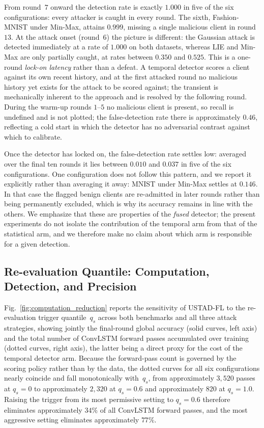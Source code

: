 \documentclass[journal]{IEEEtran}
\begin{document}
From round~$7$ onward the detection rate is exactly $1.000$ in five of the six configurations: every attacker is caught in every round. The sixth, Fashion-MNIST under Min-Max, attains $0.999$, missing a single malicious client in round~$13$. At the attack onset (round~$6$) the picture is different: the Gaussian attack is detected immediately at a rate of $1.000$ on both datasets, whereas LIE and Min-Max are only partially caught, at rates between $0.350$ and $0.525$. This is a one-round \emph{lock-on latency} rather than a defeat. A temporal detector scores a client against its own recent history, and at the first attacked round no malicious history yet exists for the attack to be scored against; the transient is mechanically inherent to the approach and is resolved by the following round. During the warm-up rounds $1$--$5$ no malicious client is present, so recall is undefined and is not plotted; the false-detection rate there is approximately $0.46$, reflecting a cold start in which the detector has no adversarial contrast against which to calibrate.

Once the detector has locked on, the false-detection rate settles low: averaged over the final ten rounds it lies between $0.010$ and $0.037$ in five of the six configurations. One configuration does not follow this pattern, and we report it explicitly rather than averaging it away: MNIST under Min-Max settles at $0.146$. In that case the flagged benign clients are re-admitted in later rounds rather than being permanently excluded, which is why its accuracy remains in line with the others. We emphasize that these are properties of the \emph{fused} detector; the present experiments do not isolate the contribution of the temporal arm from that of the statistical arm, and we therefore make no claim about which arm is responsible for a given detection.

\subsection{Re-evaluation Quantile: Computation, Detection, and Precision}
\label{sec:quantile_sweep}

Fig.~\ref{fig:computation_reduction} reports the sensitivity of USTAD-FL to the re-evaluation trigger quantile~$q_s$ across both benchmarks and all three attack strategies, showing jointly the final-round global accuracy (solid curves, left axis) and the total number of ConvLSTM forward passes accumulated over training (dotted curves, right axis), the latter being a direct proxy for the cost of the temporal detector arm. Because the forward-pass count is governed by the scoring policy rather than by the data, the dotted curves for all six configurations nearly coincide and fall monotonically with~$q_s$, from approximately $3{,}520$ passes at $q_s = 0$ to approximately $2{,}320$ at $q_s = 0.6$ and approximately $820$ at $q_s = 1.0$. Raising the trigger from its most permissive setting to $q_s = 0.6$ therefore eliminates approximately $34\%$ of all ConvLSTM forward passes, and the most aggressive setting eliminates approximately $77\%$.
\end{document}
